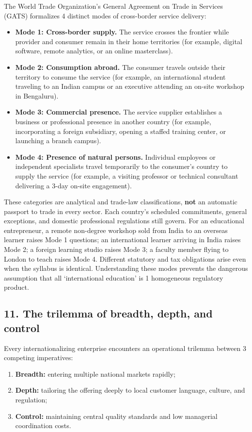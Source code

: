 The World Trade Organization's General Agreement on Trade in Services (GATS) formalizes 4 distinct modes of cross-border service delivery:
\begin{itemize}
    \item \textbf{Mode 1: Cross-border supply.} The service crosses the frontier while provider and consumer remain in their home territories (for example, digital software, remote analytics, or an online masterclass).
    \item \textbf{Mode 2: Consumption abroad.} The consumer travels outside their territory to consume the service (for example, an international student traveling to an Indian campus or an executive attending an on-site workshop in Bengaluru).
    \item \textbf{Mode 3: Commercial presence.} The service supplier establishes a business or professional presence in another country (for example, incorporating a foreign subsidiary, opening a staffed training center, or launching a branch campus).
    \item \textbf{Mode 4: Presence of natural persons.} Individual employees or independent specialists travel temporarily to the consumer's country to supply the service (for example, a visiting professor or technical consultant delivering a 3-day on-site engagement).
\end{itemize}

These categories are analytical and trade-law classifications, \textbf{not} an automatic passport to trade in every sector. Each country's scheduled commitments, general exceptions, and domestic professional regulations still govern. For an educational entrepreneur, a remote non-degree workshop sold from India to an overseas learner raises Mode 1 questions; an international learner arriving in India raises Mode 2; a foreign learning studio raises Mode 3; a faculty member flying to London to teach raises Mode 4. Different statutory and tax obligations arise even when the syllabus is identical. Understanding these modes prevents the dangerous assumption that all `international education' is 1 homogeneous regulatory product.

\subsection{11. The trilemma of breadth, depth, and control}

Every internationalizing enterprise encounters an operational trilemma between 3 competing imperatives:
\begin{enumerate}
    \item \textbf{Breadth:} entering multiple national markets rapidly;
    \item \textbf{Depth:} tailoring the offering deeply to local customer language, culture, and regulation;
    \item \textbf{Control:} maintaining central quality standards and low managerial coordination costs.
\end{enumerate}

